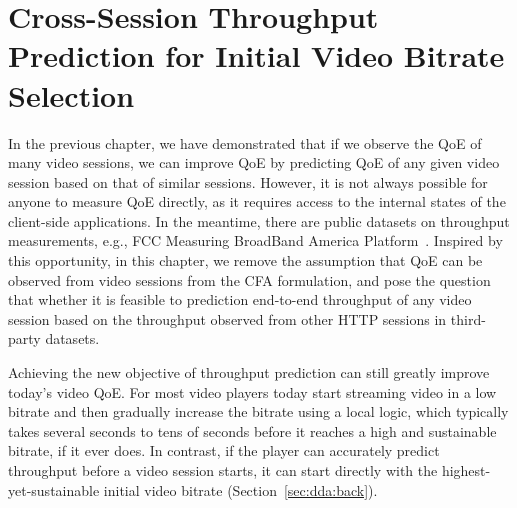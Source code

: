 \chapter{Cross-Session Throughput Prediction for Initial Video Bitrate Selection}
\label{ch:dda}

\providecommand{\name}{{DDA}\xspace}

\providecommand{\session}{\ensuremath{\mathit{s}}}
\providecommand{\SimilarSessions}[1]{\ensuremath{\mathit{SimilarSessions(#1)}}}
\providecommand{\timestamp}[1]{\ensuremath{\mathit{t_{#1}}}}
\providecommand{\AllFeatures}{\ensuremath{\mathcal{F}}}
\providecommand{\Features}{\ensuremath{\mathit{F}}}
\providecommand{\FeatureValues}[2]{\ensuremath{\mathit{FV(#1,#2)}}}
\providecommand{\TimeWindow}[2]{\ensuremath{\mathit{TimeWindow(#1,#2)}}}
\providecommand{\TimeDim}[2]{\ensuremath{\mathit{T_{#1,#2}}}}
\providecommand{\TimeRange}{\ensuremath{\mathit{T}}}
\providecommand{\Aggregation}[3]{\ensuremath{\mathit{Agg(#1,#2,#3)}}}
\providecommand{\QualitySummary}{\ensuremath{\mathit{Median}}}
\providecommand{\Error}[2]{\ensuremath{\mathit{Err(#1,#2)}}}
\providecommand{\Pred}[1]{\ensuremath{\mathit{Pred(#1)}}}
\providecommand{\Throughput}[1]{\ensuremath{\mathit{#1_{w}}}}
\providecommand{\Pair}[2]{\ensuremath{\mathit{\langle#1,#2\rangle}}}
\providecommand{\optimal}{\ensuremath{\mathit{*}}}
\providecommand{\Est}{\ensuremath{\mathit{Est}}}
\providecommand{\Estimation}[1]{\ensuremath{\mathit{\Est(#1)}}}
\providecommand{\Model}{\ensuremath{\mathit{M}}}
\providecommand{\Agg}[2]{\ensuremath{\mathit{Agg(#1,#2)}}}

In the previous chapter, we have demonstrated that if we observe the QoE of many 
video sessions, we can improve QoE by predicting QoE of any given
video session based on that of similar sessions. 
However, it is not always possible for anyone to measure 
QoE directly, 
as it requires access to the internal states of the client-side applications.
In the meantime, there are public datasets on 
throughput measurements, e.g., FCC Measuring 
BroadBand America Platform~\cite{fcc-2014}.
Inspired by this opportunity, in this chapter, we remove the assumption that QoE 
can be observed from video sessions from the CFA formulation, and 
pose the question that whether it is feasible to prediction end-to-end 
throughput of any video session based on the throughput 
observed from other HTTP sessions in third-party datasets.

Achieving the new objective of throughput prediction can still greatly improve today's
video QoE. For most video players today start
streaming video in a low bitrate and then gradually increase 
the bitrate using a local logic, which
typically takes several seconds to tens of seconds 
before it reaches a high and sustainable bitrate,
if it ever does.
In contrast, if the player can accurately predict throughput before 
a video session starts,
it can start directly with the highest-yet-sustainable initial video bitrate 
(Section~\ref{sec:dda:back}).

